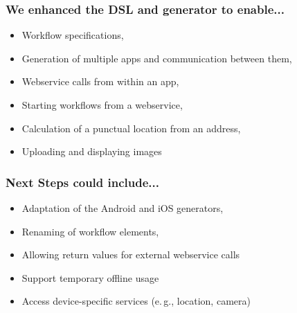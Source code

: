 \begin{frame}
    \frametitle{We enhanced the DSL and generator to enable...}
    
    \begin{itemize}
    	\item Workflow specifications,
    	\item Generation of multiple apps and communication between them,
    	\item Webservice calls from within an app,
    	\item Starting workflows from a webservice,
    	\item Calculation of a punctual location from an address,
    	\item Uploading and displaying images
    \end{itemize}

\end{frame}

\begin{frame}
    \frametitle{Next Steps could include...}

	\begin{itemize}
		\item Adaptation of the Android and iOS generators,
		\item Renaming of workflow elements,
		\item Allowing return values for external webservice calls
		\item Support temporary offline usage
		\item Access device-specific services (e.\,g., location, camera)
	\end{itemize}
\end{frame}

